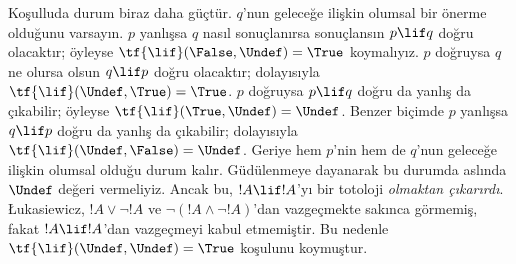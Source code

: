 Koşulluda durum biraz daha güçtür. $q$'nun geleceğe ilişkin olumsal bir
önerme olduğunu varsayın. $p$ yanlışsa $q$ nasıl sonuçlanırsa sonuçlansın
$p \lif q$ doğru olacaktır; öyleyse
$\tf{\lif}(\False, \Undef) = \True$ koymalıyız. $p$ doğruysa $q$ ne olursa
olsun $q \lif p$ doğru olacaktır; dolayısıyla
$\tf{\lif}(\Undef, \True) = \True$. $p$ doğruysa $p \lif q$ doğru da yanlış
da çıkabilir; öyleyse $\tf{\lif}(\True, \Undef) = \Undef$. Benzer biçimde
$p$ yanlışsa $q \lif p$ doğru da yanlış da çıkabilir; dolayısıyla
$\tf{\lif}(\Undef, \False) = \Undef$. Geriye hem $p$'nin hem de $q$'nun
geleceğe ilişkin olumsal olduğu durum kalır. Güdülenmeye dayanarak bu durumda
aslında $\Undef$ değeri vermeliyiz. Ancak bu, $!A \lif !A$'yı bir totoloji
\emph{olmaktan çıkarırdı}. \L ukasiewicz, $!A \lor \lnot !A$ ve
$\lnot(!A \land \lnot !A)$'dan vazgeçmekte sakınca görmemiş, fakat
$!A \lif !A$'dan vazgeçmeyi kabul etmemiştir. Bu nedenle
$\tf{\lif}(\Undef, \Undef) = \True$ koşulunu koymuştur.

